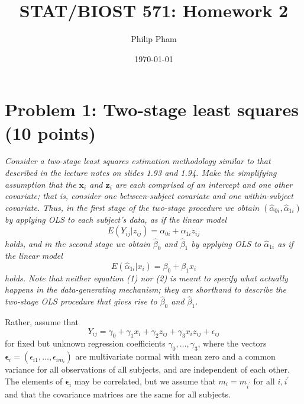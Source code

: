 \documentclass[11pt, letterpaper]{article}
\title{STAT/BIOST 571: Homework 2}
\date{\today}
\author{Philip Pham}
\newcommand{\bx}{{\bm x}}
\newcommand{\bz}{{\bm z}}
\newcommand{\bepsilon}{{\bm \epsilon}}
\begin{document}
\maketitle

\section*{Problem 1: Two-stage least squares (10 points)}
{\em Consider a two-stage least squares estimation methodology similar to that described in
the lecture notes on slides 1.93 and 1.94.  Make the simplifying assumption
that the $\bx_{i}$ and $\bz_{i}$ are each comprised of an intercept and one 
other covariate; that is, consider one
between-subject covariate and one within-subject covariate. 
Thus, in the first stage of the two-stage procedure we obtain $(\hat{\alpha}_{0i}, \hat{\alpha}_{1i})$
by applying OLS to each subject's data, as if the linear model 
\begin{equation}
\label{eqn:p1_eq1}
E(Y_{ij}|z_{ij}) = \alpha_{0i} + \alpha_{1i} z_{ij} 
\end{equation}
holds, and in the second stage we obtain $\hat{\beta}_{0}$ and $\hat{\beta}_{1}$ by applying OLS to
$\hat{\alpha}_{1i}$ as if the linear model
\begin{equation}
\label{eqn:p1_eq2}
E(\hat{\alpha}_{1i} | x_i) = \beta_0 + \beta_1 x_{i}
\end{equation}
holds.  Note that neither equation (1) nor (2) is meant to specify what actually happens in the data-generating mechanism; they are shorthand to describe the two-stage OLS procedure that gives rise to $\hat{\beta}_{0}$ and $\hat{\beta}_{1}$.

Rather, assume that 
\begin{equation}
\label{eqn:p1_eq3}
Y_{ij} = \gamma_0 + \gamma_1 x_i + \gamma_2 z_{ij} + \gamma_3 x_i z_{ij} + \epsilon_{ij}
\end{equation}
for fixed but unknown regression coefficients $\gamma_0, \ldots, \gamma_3$, where the vectors $\bepsilon_i=(\epsilon_{i1},\ldots,\epsilon_{im_i})$
are multivariate normal with mean zero and a common variance for all observations of all subjects, and are independent of each other.  
The elements of $\bepsilon_i$ may be correlated, but we assume that $m_i = m_{i^\prime}$ for all $i, i^\prime$ and that the covariance matrices are the same for all subjects.}
\end{document}
